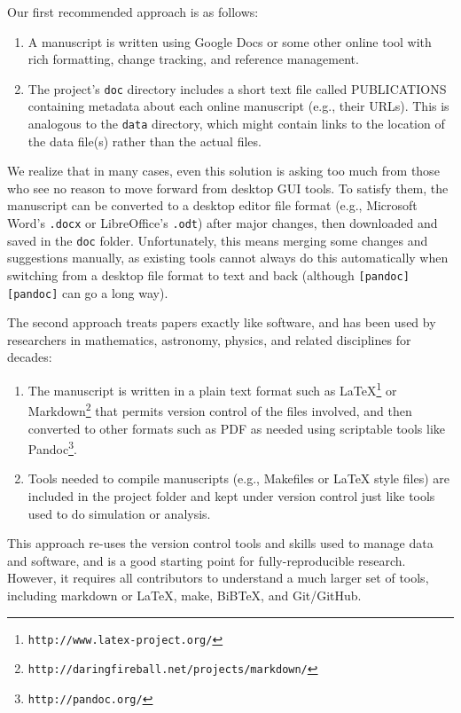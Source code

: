 \documentclass[10pt]{article}
\newcommand{\withurl}[2]{{#1}\footnote{\texttt{#2}}}
\begin{document}
Our first recommended approach is as follows:

\begin{enumerate}
\item
  A manuscript is written using Google Docs or some other online tool
  with rich formatting, change tracking, and reference management.
\item
  The project's \texttt{doc} directory includes a short text file called
  PUBLICATIONS containing metadata about each online manuscript (e.g.,
  their URLs). This is analogous to the \texttt{data} directory, which
  might contain links to the location of the data file(s) rather than
  the actual files.
\end{enumerate}

We realize that in many cases, even this solution is asking too much
from those who see no reason to move forward from desktop GUI tools. To
satisfy them, the manuscript can be converted to a desktop editor file
format (e.g., Microsoft Word's \texttt{.docx} or LibreOffice's
\texttt{.odt}) after major changes, then downloaded and saved in the
\texttt{doc} folder. Unfortunately, this means merging some changes and
suggestions manually, as existing tools cannot always do this
automatically when switching from a desktop file format to text and back
(although \texttt{{[}pandoc{]}{[}pandoc{]}} can go a long way).

The second approach treats papers exactly like software, and has been
used by researchers in mathematics, astronomy, physics, and related
disciplines for decades:

\begin{enumerate}
\item
  The manuscript is written in a plain text format such as
  \withurl{LaTeX}{http://www.latex-project.org/} or
  \withurl{Markdown}{http://daringfireball.net/projects/markdown/} that
  permits version control of the files involved, and then converted to
  other formats such as PDF as needed using scriptable tools like
  \withurl{Pandoc}{http://pandoc.org/}.
\item
  Tools needed to compile manuscripts (e.g., Makefiles or LaTeX style
  files) are included in the project folder and kept under version
  control just like tools used to do simulation or analysis.
\end{enumerate}

This approach re-uses the version control tools and skills used to
manage data and software, and is a good starting point for
fully-reproducible research. However, it requires all contributors to
understand a much larger set of tools, including markdown or LaTeX,
make, BiBTeX, and Git/GitHub.
\end{document}

